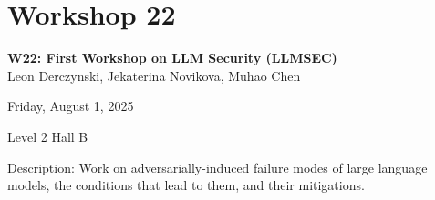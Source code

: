 \clearpage


\section[W22: First Workshop on LLM Security (LLMSEC)]{Workshop 22}
\label{workshop_22}

\begin{center}
    {\Large \textbf{W22: First Workshop on LLM Security (LLMSEC)}}\\
    

Leon Derczynski, Jekaterina Novikova, Muhao Chen

    Friday, August 1, 2025

   Level 2 Hall B
    
\end{center}

Description: Work on adversarially-induced failure modes of large language models, the conditions that lead to them, and their mitigations.

